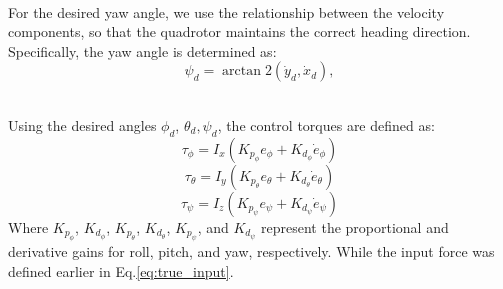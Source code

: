 \documentclass[main]{subfiles}
\begin{document}
\noindent\\
For the desired yaw angle, we use the relationship between the velocity 
components, so that the quadrotor maintains the correct heading direction.
Specifically, the yaw angle is determined as:
\begin{equation}
    \psi_d = \arctan2(\dot{y}_d, \dot{x}_d),
\end{equation}

\noindent\\
Using the desired angles $\phi_d$, $\theta_d, \psi_d$, the control torques are defined as:
\begin{equation}
    \label{eq:input_phi}
    \tau_\phi = I_x \left(  K_{p_\phi} e_\phi + K_{d_\phi} \dot{e}_\phi \right)
\end{equation}
\begin{equation}
    \label{eq:input_theta}
    \tau_\theta = I_y \left(K_{p_\theta} e_\theta + K_{d_\theta} \dot{e}_\theta \right)
\end{equation}
\begin{equation}
    \label{eq:input_psi}
    \tau_\psi = I_z \left(K_{p_\psi} e_\psi + K_{d_\psi} \dot{e}_\psi \right)
\end{equation}
Where $K_{p_\phi}$, $K_{d_\phi}$, $K_{p_\theta}$, $K_{d_\theta}$, $K_{p_\psi}$, and $K_{d_\psi}$ 
represent the proportional and derivative gains for roll, pitch, and yaw, respectively. 
While the input force was defined earlier in Eq.\ref{eq:true_input}.
\end{document}
